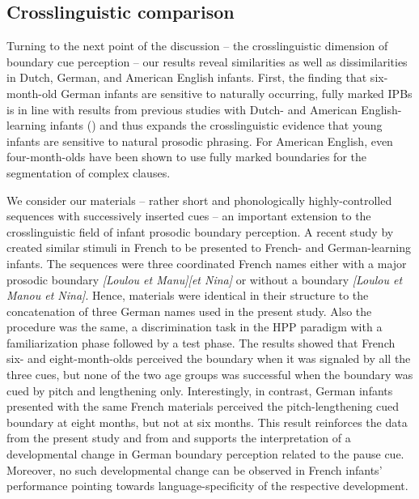 \documentclass[output=paper]{langscibook}
\begin{document}
\subsection{Crosslinguistic comparison} 
Turning to the next point of the discussion -- the crosslinguistic dimension of boundary cue perception -- our results reveal similarities as well as dissimilarities in Dutch, German, and American English infants. First, the finding that six-month-old German infants are sensitive to naturally occurring, fully marked IPBs is in line with results from previous studies with Dutch- and American English-learning infants (\citealt{Johnson2008, Nazzi2000, Seidl2007,Soderstrom2005}) and thus expands the crosslinguistic evidence that young infants are sensitive to natural prosodic phrasing. For American English, even four-month-olds have been shown to use fully marked boundaries for the segmentation of complex clauses.

\begin{sloppypar}
We consider our materials – rather short and phonologically highly-controlled sequences with successively inserted cues – an important extension to the crosslinguistic field of infant prosodic boundary perception. A recent study by \citet{VanOmmen2020} created similar stimuli in French to be presented to French- and German-learning infants. The sequences were three coordinated French names either with a major prosodic boundary \textit{[Loulou et Manu][et Nina]} or without a boundary \textit{[Loulou et Manou et Nina]}. Hence, materials were identical in their structure to the concatenation of three German names used in the present study. Also the procedure was the same, a discrimination task in the HPP paradigm with a familiarization phase followed by a test phase. The results showed that French six- and eight-month-olds perceived the boundary when it was signaled by all the three cues, but none of the two age groups was successful when the boundary was cued by pitch and lengthening only. Interestingly, in contrast, German infants presented with the same French materials perceived the pitch-lengthening cued boundary at eight months, but not at six months. This result reinforces the data from the present study and from \citet{Wellmann2012} and supports the interpretation of a developmental change in German boundary perception related to the pause cue. Moreover, no such developmental change can be observed in French infants’ performance pointing towards language-specificity of the respective development.
\end{sloppypar}
\end{document}
